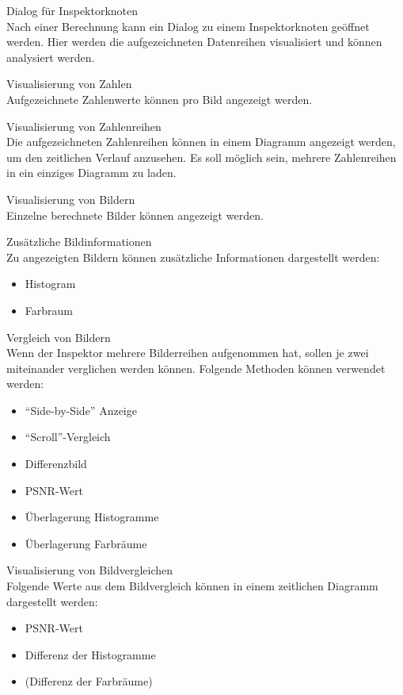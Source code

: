 \begin{speclist}[F]
\setcounter{specnum}{41010}

\spec Dialog für Inspektorknoten \\
Nach einer Berechnung kann ein Dialog zu einem Inspektorknoten geöffnet werden. Hier werden die aufgezeichneten Datenreihen visualisiert und können analysiert werden.

\spec Visualisierung von Zahlen \\
Aufgezeichnete Zahlenwerte können pro Bild angezeigt werden.

\spec Visualisierung von Zahlenreihen \\
Die aufgezeichneten Zahlenreihen können in einem Diagramm angezeigt werden, um den zeitlichen Verlauf anzusehen. Es soll möglich sein, mehrere Zahlenreihen in ein einziges Diagramm zu laden.

\spec Visualisierung von Bildern \\
Einzelne berechnete Bilder können angezeigt werden.

\spec Zusätzliche Bildinformationen \\
Zu angezeigten Bildern können zusätzliche Informationen dargestellt werden:
\begin{itemize}
	\item Histogram
	\item Farbraum
\end{itemize}

\spec Vergleich von Bildern \\
Wenn der Inspektor mehrere Bilderreihen aufgenommen hat, sollen je zwei miteinander verglichen werden können. Folgende Methoden können verwendet werden:
\begin{itemize}
	\item "`Side-by-Side"' Anzeige
	\item "`Scroll"'-Vergleich
	\item Differenzbild
	\item PSNR-Wert
	\item Überlagerung Histogramme
	\item Überlagerung Farbräume
\end{itemize}

\spec Visualisierung von Bildvergleichen \\
Folgende Werte aus dem Bildvergleich können in einem zeitlichen Diagramm dargestellt werden:
\begin{itemize}
	\item PSNR-Wert
	\item Differenz der Histogramme
	\item (Differenz der Farbräume)
\end{itemize}


\end{speclist}
